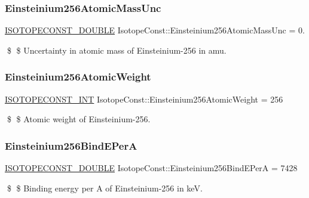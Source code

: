 \subsubsection{\texorpdfstring{Einsteinium256\+Atomic\+Mass\+Unc}{Einsteinium256AtomicMassUnc}}
{\footnotesize\ttfamily \mbox{\hyperlink{group___isotope_const-_macros_ga8f45a7272ce02c0b4c65c44636ed719a}{I\+S\+O\+T\+O\+P\+E\+C\+O\+N\+S\+T\+\_\+\+D\+O\+U\+B\+LE}} Isotope\+Const\+::\+Einsteinium256\+Atomic\+Mass\+Unc = 0.}

\$ \$ Uncertainty in atomic mass of Einsteinium-\/256 in amu. \mbox{\label{group___isotope_const-_einsteinium-_es256_gac63b48bbca5c2c8831d8d5adc2755b47}} 
\subsubsection{\texorpdfstring{Einsteinium256\+Atomic\+Weight}{Einsteinium256AtomicWeight}}
{\footnotesize\ttfamily \mbox{\hyperlink{group___isotope_const-_macros_ga5f18360b3e99483a35c32d789e62621c}{I\+S\+O\+T\+O\+P\+E\+C\+O\+N\+S\+T\+\_\+\+I\+NT}} Isotope\+Const\+::\+Einsteinium256\+Atomic\+Weight = 256}

\$ \$ Atomic weight of Einsteinium-\/256. \mbox{\label{group___isotope_const-_einsteinium-_es256_ga1014931d98f67c987065b9a478c31873}} 
\subsubsection{\texorpdfstring{Einsteinium256\+Bind\+E\+PerA}{Einsteinium256BindEPerA}}
{\footnotesize\ttfamily \mbox{\hyperlink{group___isotope_const-_macros_ga8f45a7272ce02c0b4c65c44636ed719a}{I\+S\+O\+T\+O\+P\+E\+C\+O\+N\+S\+T\+\_\+\+D\+O\+U\+B\+LE}} Isotope\+Const\+::\+Einsteinium256\+Bind\+E\+PerA = 7428}

\$ \$ Binding energy per A of Einsteinium-\/256 in keV. \mbox{\label{group___isotope_const-_einsteinium-_es256_ga9c8a0cc8111fc54d2b53674bae4335a8}} 
